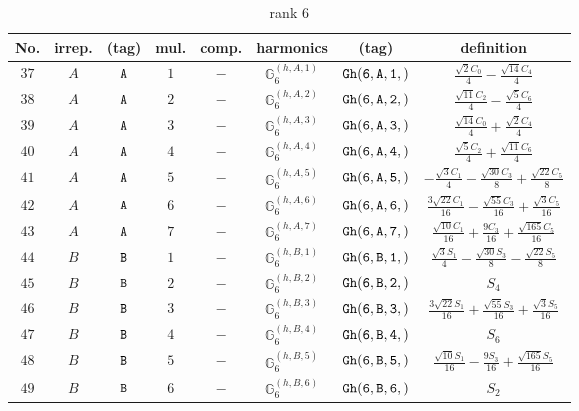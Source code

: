 \documentclass[fleqn,8pt]{jsarticle}
\begin{document}
\begin{table}[ht!]
\begin{center}
\caption{rank 6}
\renewcommand{\arraystretch}{1.3}
\begin{tabular}{cccccccc} \hline \hline
No. & irrep. & (tag) & mul. & comp. & harmonics & (tag) & definition \\ \hline
$ 37 $ & $ A $ & $ {\tt A} $ & $ 1 $ & $ - $ & $ \mathbb{G}_{6}^{(h,A,1)} $ & $ {\tt Gh(6,A,1,)} $ & $ \frac{\sqrt{2} C_{0}}{4} - \frac{\sqrt{14} C_{4}}{4} $ \\
$ 38 $ & $ A $ & $ {\tt A} $ & $ 2 $ & $ - $ & $ \mathbb{G}_{6}^{(h,A,2)} $ & $ {\tt Gh(6,A,2,)} $ & $ \frac{\sqrt{11} C_{2}}{4} - \frac{\sqrt{5} C_{6}}{4} $ \\
$ 39 $ & $ A $ & $ {\tt A} $ & $ 3 $ & $ - $ & $ \mathbb{G}_{6}^{(h,A,3)} $ & $ {\tt Gh(6,A,3,)} $ & $ \frac{\sqrt{14} C_{0}}{4} + \frac{\sqrt{2} C_{4}}{4} $ \\
$ 40 $ & $ A $ & $ {\tt A} $ & $ 4 $ & $ - $ & $ \mathbb{G}_{6}^{(h,A,4)} $ & $ {\tt Gh(6,A,4,)} $ & $ \frac{\sqrt{5} C_{2}}{4} + \frac{\sqrt{11} C_{6}}{4} $ \\
$ 41 $ & $ A $ & $ {\tt A} $ & $ 5 $ & $ - $ & $ \mathbb{G}_{6}^{(h,A,5)} $ & $ {\tt Gh(6,A,5,)} $ & $ - \frac{\sqrt{3} C_{1}}{4} - \frac{\sqrt{30} C_{3}}{8} + \frac{\sqrt{22} C_{5}}{8} $ \\
$ 42 $ & $ A $ & $ {\tt A} $ & $ 6 $ & $ - $ & $ \mathbb{G}_{6}^{(h,A,6)} $ & $ {\tt Gh(6,A,6,)} $ & $ \frac{3 \sqrt{22} C_{1}}{16} - \frac{\sqrt{55} C_{3}}{16} + \frac{\sqrt{3} C_{5}}{16} $ \\
$ 43 $ & $ A $ & $ {\tt A} $ & $ 7 $ & $ - $ & $ \mathbb{G}_{6}^{(h,A,7)} $ & $ {\tt Gh(6,A,7,)} $ & $ \frac{\sqrt{10} C_{1}}{16} + \frac{9 C_{3}}{16} + \frac{\sqrt{165} C_{5}}{16} $ \\
$ 44 $ & $ B $ & $ {\tt B} $ & $ 1 $ & $ - $ & $ \mathbb{G}_{6}^{(h,B,1)} $ & $ {\tt Gh(6,B,1,)} $ & $ \frac{\sqrt{3} S_{1}}{4} - \frac{\sqrt{30} S_{3}}{8} - \frac{\sqrt{22} S_{5}}{8} $ \\
$ 45 $ & $ B $ & $ {\tt B} $ & $ 2 $ & $ - $ & $ \mathbb{G}_{6}^{(h,B,2)} $ & $ {\tt Gh(6,B,2,)} $ & $ S_{4} $ \\
$ 46 $ & $ B $ & $ {\tt B} $ & $ 3 $ & $ - $ & $ \mathbb{G}_{6}^{(h,B,3)} $ & $ {\tt Gh(6,B,3,)} $ & $ \frac{3 \sqrt{22} S_{1}}{16} + \frac{\sqrt{55} S_{3}}{16} + \frac{\sqrt{3} S_{5}}{16} $ \\
$ 47 $ & $ B $ & $ {\tt B} $ & $ 4 $ & $ - $ & $ \mathbb{G}_{6}^{(h,B,4)} $ & $ {\tt Gh(6,B,4,)} $ & $ S_{6} $ \\
$ 48 $ & $ B $ & $ {\tt B} $ & $ 5 $ & $ - $ & $ \mathbb{G}_{6}^{(h,B,5)} $ & $ {\tt Gh(6,B,5,)} $ & $ \frac{\sqrt{10} S_{1}}{16} - \frac{9 S_{3}}{16} + \frac{\sqrt{165} S_{5}}{16} $ \\
$ 49 $ & $ B $ & $ {\tt B} $ & $ 6 $ & $ - $ & $ \mathbb{G}_{6}^{(h,B,6)} $ & $ {\tt Gh(6,B,6,)} $ & $ S_{2} $ \\
 \hline \hline
\end{tabular}
\end{center}
\end{table}
\end{document}
